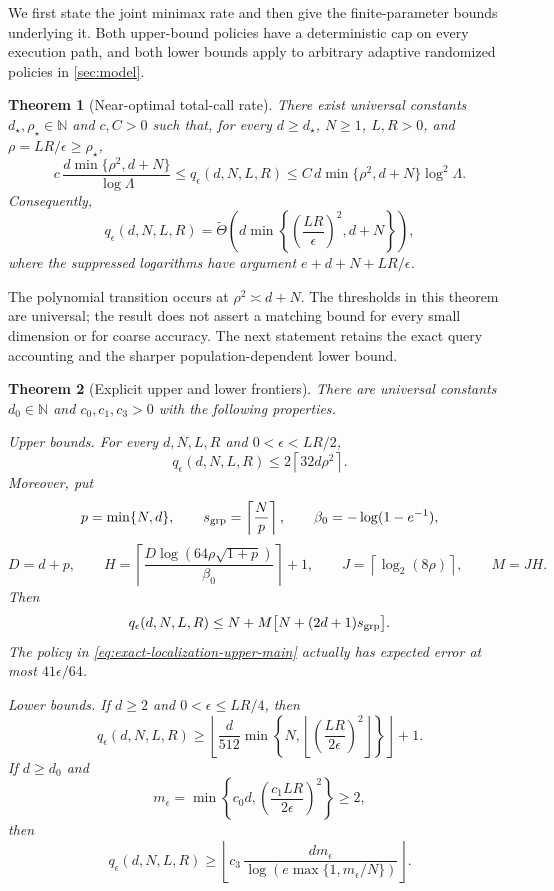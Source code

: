 \documentclass[11pt]{article}
\numberwithin{equation}{section}
\newtheorem{theorem}{Theorem}[section]
\theoremstyle{remark}
\theoremstyle{definition}
\newcommand{\eps}{\epsilon}
\begin{document}
We first state the joint minimax rate and then give the finite-parameter
bounds underlying it. Both upper-bound policies have a deterministic
cap on every execution path, and both lower bounds apply to arbitrary
adaptive randomized policies in \cref{sec:model}.

\begin{theorem}[Near-optimal total-call rate]
\label{thm:main-rate}
There exist universal constants $d_\star,\rho_\star\in\mathbb N$ and $c,C>0$ such that, for every $d\ge d_\star$, $N\ge1$, $L,R>0$, and $\rho=LR/\eps\ge\rho_\star$,
\begin{equation}
 c\,
 \frac{d\min\{\rho^2,d+N\}}{\log\Lambda}
 \le
 q_\eps(d,N,L,R)
 \le
 C\,d\min\{\rho^2,d+N\}\log^2\Lambda.
\label{eq:main-rate}
\end{equation}
Consequently,
\[
q_\eps(d,N,L,R)
=
\widetilde\Theta\!\left(
 d\min\left\{\left(\frac{LR}{\eps}\right)^2,d+N\right\}
\right),
\]
where the suppressed logarithms have argument $e+d+N+LR/\eps$.
\end{theorem}

The polynomial transition occurs at $\rho^2\asymp d+N$.
The thresholds in this theorem are universal; the result does not
assert a matching bound for every small dimension or for coarse
accuracy. The next statement retains the exact query accounting and
the sharper population-dependent lower bound.

\begin{theorem}[Explicit upper and lower frontiers]
\label{thm:explicit-frontier}
There are universal constants $d_0\in\mathbb N$ and $c_0,c_1,c_3>0$ with the following properties.

\emph{Upper bounds.}  For every $d,N,L,R$ and $0<\eps<LR/2$,
\begin{equation}
q_\eps(d,N,L,R)
\le 2\left\lceil32d\rho^2\right\rceil.
\label{eq:stochastic-upper-main}
\end{equation}
Moreover, put
\[
p=\min\{N,d\},\qquad
s_{\rm grp}=\left\lceil\frac Np\right\rceil,
\qquad
\beta_0=-\log(1-e^{-1}),
\]
\[
D=d+p,
\qquad
H=\left\lceil
\frac{D\log(64\rho\sqrt{1+p})}{\beta_0}
\right\rceil+1,
\qquad
J=\left\lceil\log_2(8\rho)\right\rceil,
\qquad M=JH.
\]
Then
\begin{equation}
q_\eps(d,N,L,R)
\le
N+M\bigl[N+(2d+1)s_{\rm grp}\bigr].
\label{eq:exact-localization-upper-main}
\end{equation}
The policy in \eqref{eq:exact-localization-upper-main} actually has expected error at most $41\eps/64$.

\emph{Lower bounds.}  If $d\ge2$ and $0<\eps\le LR/4$, then
\begin{equation}
q_\eps(d,N,L,R)
\ge
\left\lfloor
\frac d{512}
\min\left\{N,
\left\lfloor\left(\frac{LR}{2\eps}\right)^2\right\rfloor
\right\}
\right\rfloor+1.
\label{eq:affine-lower-main}
\end{equation}
If $d\ge d_0$ and
\[
m_\eps=
\min\left\{c_0d,
\left(\frac{c_1LR}{2\eps}\right)^2\right\}\ge2,
\]
then
\begin{equation}
q_\eps(d,N,L,R)
\ge
\left\lfloor
c_3\,
\frac{d m_\eps}
{\log\!\left(e\max\{1,m_\eps/N\}\right)}
\right\rfloor.
\label{eq:support-lower-main}
\end{equation}
\end{theorem}
\end{document}
